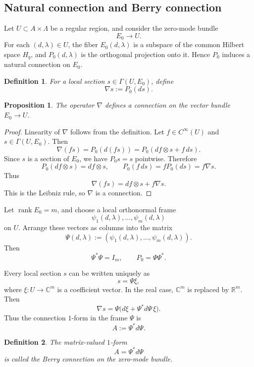 \documentclass[pdflatex,sn-mathphys-num]{sn-jnl}%
\theoremstyle{thmstyleone}%
\newtheorem{proposition}[theorem]{Proposition}%
\theoremstyle{thmstyletwo}%
\theoremstyle{thmstylethree}%
\newtheorem{definition}{Definition}%
\begin{document}
\subsection{Natural connection and Berry connection}

Let \(U\subset A\times\Lambda\) be a regular region, and consider the zero-mode bundle
\[
E_0\to U.
\]
For each \((d,\lambda)\in U\), the fiber \(E_0(d,\lambda)\) is a subspace of the common Hilbert space \(H_q\), and \(P_0(d,\lambda)\) is the orthogonal projection onto it. Hence \(P_0\) induces a natural connection on \(E_0\).

\begin{definition}
For a local section \(s\in\Gamma(U,E_0)\), define
\[
\nabla s:=P_0(ds).
\]
\end{definition}

\begin{proposition}
The operator \(\nabla\) defines a connection on the vector bundle \(E_0\to U\).
\end{proposition}

\begin{proof}
Linearity of \(\nabla\) follows from the definition. Let \(f\in C^\infty(U)\) and \(s\in\Gamma(U,E_0)\). Then
\[
\nabla(fs)
=
P_0(d(fs))
=
P_0(df\otimes s+f\,ds).
\]
Since \(s\) is a section of \(E_0\), we have \(P_0s=s\) pointwise. Therefore
\[
P_0(df\otimes s)=df\otimes s,
\qquad
P_0(f\,ds)=fP_0(ds)=f\nabla s.
\]
Thus
\[
\nabla(fs)=df\otimes s+f\nabla s.
\]
This is the Leibniz rule, so \(\nabla\) is a connection.
\end{proof}

Let \(\operatorname{rank}E_0=m\), and choose a local orthonormal frame
\[
\psi_1(d,\lambda),\dots,\psi_m(d,\lambda)
\]
on \(U\). Arrange these vectors as columns into the matrix
\[
\Psi(d,\lambda)
:=
(\psi_1(d,\lambda),\dots,\psi_m(d,\lambda)).
\]
Then
\[
\Psi^\ast\Psi=I_m,
\qquad
P_0=\Psi\Psi^\ast.
\]

Every local section \(s\) can be written uniquely as
\[
s=\Psi\xi,
\]
where \(\xi:U\to\mathbb C^m\) is a coefficient vector. In the real case, \(\mathbb C^m\) is replaced by \(\mathbb R^m\). Then
\[
\nabla s
=
\Psi\bigl(d\xi+\Psi^\ast d\Psi\,\xi\bigr).
\]
Thus the connection \(1\)-form in the frame \(\Psi\) is
\[
A:=\Psi^\ast d\Psi.
\]

\begin{definition}
The matrix-valued \(1\)-form
\[
A=\Psi^\ast d\Psi
\]
is called the Berry connection on the zero-mode bundle.
\end{definition}
\end{document}
